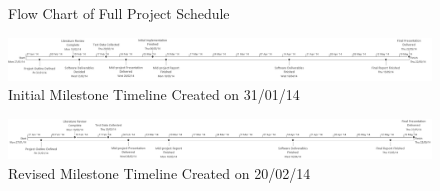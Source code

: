 \begin{figure}[h]
	\centering
	\caption{Flow Chart of Full Project Schedule}
	\label{fig:full-project-process}
\end{figure}

\begin{landscape}	
	\begin{figure}
		\centering
		\centerline{ \includegraphics[scale=0.475]{figures/schedule/initial_schedule_timeline.pdf} }
		\caption{Initial Milestone Timeline Created on 31/01/14}
		\label{fig:initial-milestone-timeline}
	\end{figure}

	\begin{figure}
		\centering
		\centerline{ \includegraphics[scale=0.475]{figures/schedule/revised_schedule_timeline.pdf} }
		\caption{Revised Milestone Timeline Created on 20/02/14}
		\label{fig:revised-milestone-timeline}
	\end{figure}	
\end{landscape}



